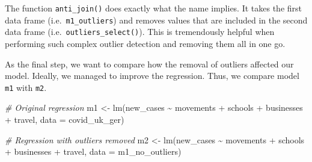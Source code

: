 \documentclass[
]{book}
\newenvironment{Shaded}{\begin{snugshade}}{\end{snugshade}}
\newcommand{\AttributeTok}[1]{\textcolor[rgb]{0.77,0.63,0.00}{#1}}
\newcommand{\CommentTok}[1]{\textcolor[rgb]{0.56,0.35,0.01}{\textit{#1}}}
\newcommand{\FunctionTok}[1]{\textcolor[rgb]{0.00,0.00,0.00}{#1}}
\newcommand{\NormalTok}[1]{#1}
\newcommand{\OtherTok}[1]{\textcolor[rgb]{0.56,0.35,0.01}{#1}}
\newcommand{\SpecialCharTok}[1]{\textcolor[rgb]{0.00,0.00,0.00}{#1}}
\begin{document}
The function \texttt{anti\_join()} does exactly what the name implies. It takes the first data frame (i.e.~\texttt{m1\_outliers}) and removes values that are included in the second data frame (i.e.~\texttt{outliers\_select()}). This is tremendously helpful when performing such complex outlier detection and removing them all in one go.

As the final step, we want to compare how the removal of outliers affected our model. Ideally, we managed to improve the regression. Thus, we compare model \texttt{m1} with \texttt{m2}.

\begin{Shaded}
\begin{Highlighting}[]
\CommentTok{\# Original regression}
\NormalTok{m1 }\OtherTok{\textless{}{-}} \FunctionTok{lm}\NormalTok{(new\_cases }\SpecialCharTok{\textasciitilde{}}\NormalTok{ movements }\SpecialCharTok{+}\NormalTok{ schools }\SpecialCharTok{+}\NormalTok{ businesses }\SpecialCharTok{+}\NormalTok{ travel,}
         \AttributeTok{data =}\NormalTok{ covid\_uk\_ger)}

\CommentTok{\# Regression with outliers removed}
\NormalTok{m2 }\OtherTok{\textless{}{-}} \FunctionTok{lm}\NormalTok{(new\_cases }\SpecialCharTok{\textasciitilde{}}\NormalTok{ movements }\SpecialCharTok{+}\NormalTok{ schools }\SpecialCharTok{+}\NormalTok{ businesses }\SpecialCharTok{+}\NormalTok{ travel,}
         \AttributeTok{data =}\NormalTok{ m1\_no\_outliers)}


\end{Highlighting}
\end{Shaded}
\end{document}
